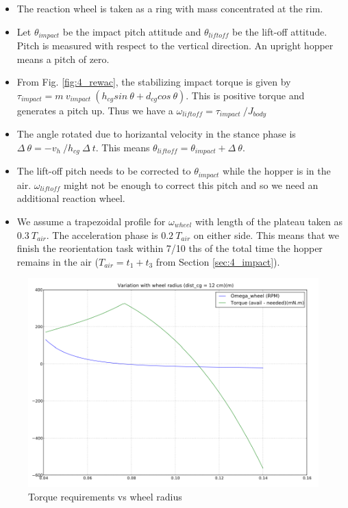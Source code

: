 \begin{itemize}
\item
The reaction wheel is taken as a ring with mass concentrated at the rim.
\item
Let $\theta_{impact}$ be the impact pitch attitude and $\theta_{liftoff}$ be the lift-off attitude. Pitch is measured with respect to
the vertical direction. An upright hopper means a pitch of zero.
\item
From Fig. \ref{fig:4_rewac}, the stabilizing impact torque is given by $\tau_{impact} = m\:v_{impact}\:(h_{cg} sin\:\theta + d_{cg}
cos\:\theta)$. This is positive torque and generates a pitch up. Thus we have a $\omega_{liftoff} = \tau_{impact}\:/J_{body}$
\item
The angle rotated due to horizantal velocity in the stance phase is $\Delta\:\theta = -v_h\:/h_{cg}\:\Delta\:t$. This means
$\theta_{liftoff} = \theta_{impact} + \Delta\:\theta$.
\item
The lift-off pitch needs to be corrected to $\theta_{impact}$ while the hopper is in the air. $\omega_{liftoff}$ might not be enough
to correct this pitch and so we need an additional reaction wheel.
\item
We assume a trapezoidal profile for $\omega_{wheel}$ with length of the plateau taken as $0.3\:T_{air}$. The acceleration phase is
$0.2\:T_{air}$ on either side. This means that we finish the reorientation task within 7/10 ths of the total time the hopper remains in
the air ($T_{air} = t_1 + t_3$ from Section \ref{sec:4_impact}).
\end{itemize}
\begin{figure}[!h]
\centering
\includegraphics[scale=1.8]{fig/rewac_radius.pdf}
\caption{Torque requirements vs wheel radius}
\label{fig:4_rewac_radius}
\end{figure}
